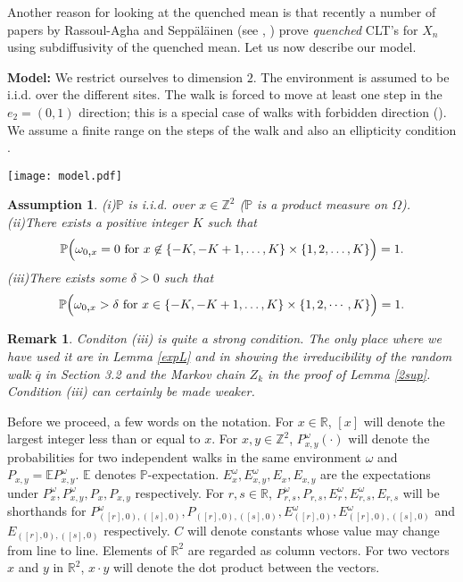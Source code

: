 \documentclass[11pt]{amsart}
\newtheorem{assumption}[theorem]{\sc Assumption}
\newtheorem{remark}[theorem]{\sc Remark}
\begin{document}
Another reason for looking at the quenched mean is that recently a number of papers by Rassoul-Agha and Sepp\"al\"ainen (see \cite{rsptrf}, \cite{rsqi}) prove \textit{quenched} CLT's for $X_n$ using subdiffusivity of the quenched mean. Let us now describe our model.

\bigskip

 \textbf{Model:} We restrict ourselves to dimension $2$. The environment is assumed to be i.i.d. over the different sites. The walk is forced to move at least one step in the $e_2=(0,1)$ direction; this is a special case of walks with forbidden direction (\cite{rsqi}). We assume a finite range on the steps of the walk and also an ellipticity condition .\\

\begin{center}\texttt{[image: model.pdf]} \end{center}

\begin{assumption}
\label{model} 
 (i)$\mathbb{P}$ is i.i.d. over $x \in \mathbb{Z}^2$ ($\mathbb{P}$ is a product measure on $\Omega$).\\
 (ii)There exists a positive integer $K$ such that 
\[ \mathbb{P}\Big{(}\omega_{0\mbox{,}x}=0 \mbox{ for } x \not\in \{-K,-K+1,\dots, K\}\times \{1,2,\dots,K\}\Big{)}=1 .\]
(iii)There exists some $\delta >0$ such that
\begin{equation*}
 \mathbb{P}\Big{(}\omega_{0\mbox{,}x} > \delta \mbox{ for } x \in \lbrace-K,-K+1,\dots, K\rbrace\times\lbrace 1,2,\cdots, K \rbrace \Big{)}=1  .  
\end{equation*}
\end{assumption}
\begin{remark}
 Conditon (iii) is quite a strong condition. The only place where we have used it are in Lemma \ref{expL} and in showing the irreducibility of the random walk $\overline{q}$ in Section 3.2 and the Markov chain $Z_k$ in the proof of Lemma \ref{2sup}. Condition (iii) can certainly be made weaker. 
\end{remark}

Before we proceed, a few words on the notation. For $x\in \mathbb{R}$, $[x]$ will denote the largest integer less than or equal to $x$. For $x,y \in \mathbb{Z}^2$, $P_{x,y}^{\omega}( \cdot) $ will denote the probabilities for two independent walks in the same environment $\omega$ and $P_{x,y}= \mathbb{E} P_{x,y}^{\omega}$.  $\mathbb{E}$ denotes $\mathbb{P}$-expectation. $E_x^{\omega}, E_{x,y}^{\omega}, E_x, E_{x,y}$ are the expectations under $P_x^{\omega}, P_{x,y}^{\omega}, P_x, P_{x,y}$ respectively. For $r,s \in \mathbb{R}$, $P_{r,s}^{\omega}, P_{r,s}, E_{r}^{\omega},E_{r,s}^{\omega},E_{r,s}$ will be shorthands for $P_{([r],0),([s],0)}^{\omega},P_{([r],0),([s],0)},E_{([r],0)}^{\omega},E_{([r],0),([s],0)}^{\omega}$ and $E_{([r],0),([s],0)}$ respectively. $C$ will denote constants whose value may change from line to line. Elements of $\mathbb{R}^2$ are regarded as column vectors. For two vectors $x$ and $y$ in $\mathbb{R}^2$, $x\cdot y$ will denote the dot product between the vectors.
\end{document}

